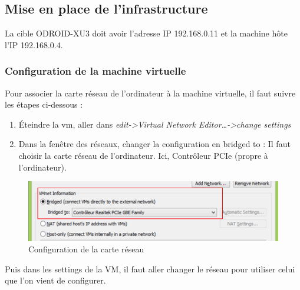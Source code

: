 \subsection{Mise en place de l'infrastructure}
La cible ODROID-XU3 doit avoir l’adresse IP 192.168.0.11 et la machine hôte l’IP 192.168.0.4.
\subsubsection{Configuration de la machine virtuelle}
Pour associer la carte réseau de l’ordinateur à la machine virtuelle, il faut suivre les étapes ci-dessous :
\begin{enumerate}
	\item Éteindre la vm, aller dans\textit{ edit->Virtual Network Editor…->change settings}
	\item Dans la fenêtre des réseaux, changer la configuration en bridged to : Il faut choisir la carte réseau de l'ordinateur. Ici, Contrôleur PCIe (propre à l’ordinateur).
\end{enumerate}
\begin{figure}[H]
	\begin{center}
		\includegraphics[width=14cm]{img/vmConfig1.png}
		\caption{Configuration de la carte réseau}
		\label{evLinuxConfig1}
	\end{center}
\end{figure}
Puis dans les settings de la VM, il faut aller changer le réseau pour utiliser celui que l’on vient de configurer.
